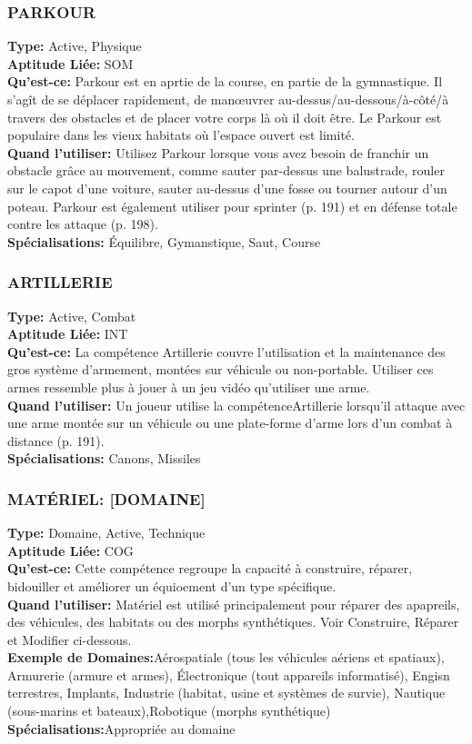 \subsubsection{PARKOUR} \textbf{Type:} Active, Physique\\ \textbf{Aptitude Liée:} SOM \\ \textbf{Qu'est-ce:} Parkour est en aprtie de la course, en partie de la gymnastique. Il s'agît de se déplacer rapidement, de manœuvrer au-dessus/au-dessous/à-côté/à travers des obstacles et de placer votre corps là où il doit être. Le Parkour est populaire dans les vieux habitats où l'espace ouvert est limité. \\ \textbf{Quand l'utiliser:} Utilisez Parkour lorsque vous avez besoin de franchir un obstacle grâce au mouvement, comme sauter par-dessus une balustrade, rouler sur le capot d'une voiture, sauter au-dessus d'une fosse ou tourner autour d'un poteau. Parkour est également utiliser pour sprinter (p. 191) et en défense totale contre les attaque (p. 198). \\ \textbf{Spécialisations:} Équilibre, Gymanstique, Saut, Course 

\subsubsection{ARTILLERIE} \textbf{Type:} Active, Combat \\ \textbf{Aptitude Liée:} INT \\ \textbf{Qu'est-ce:} La compétence Artillerie couvre l'utilisation et la maintenance des gros système d'armement, montées sur véhicule ou non-portable. Utiliser ces armes ressemble plus à jouer à un jeu vidéo qu'utiliser une arme. \\ \textbf{Quand l'utiliser:} Un joueur utilise la compétenceArtillerie lorsqu'il attaque avec une arme montée sur un véhicule ou une plate-forme d'arme lors d'un combat à distance (p. 191). \\ \textbf{Spécialisations:} Canons, Missiles 

\subsubsection{MATÉRIEL: [DOMAINE]} \textbf{Type:} Domaine, Active, Technique \\ \textbf{Aptitude Liée:} COG \\ \textbf{Qu'est-ce:} Cette compétence regroupe la capacité à construire, réparer, bidouiller et améliorer un équioement d'un type spécifique. \\ \textbf{Quand l'utiliser:} Matériel est utilisé principalement pour réparer des apapreils, des véhicules, des habitats ou des morphs synthétiques. Voir Construire, Réparer et Modifier ci-dessous. \\ \textbf{Exemple de Domaines:}Aérospatiale (tous les véhicules aériens et spatiaux), Armurerie (armure et armes), Électronique (tout appareils informatisé), Engisn terrestres, Implants, Industrie (habitat, usine et systèmes de survie), Nautique (sous-marins et bateaux),Robotique (morphs synthétique) \\ \textbf{Spécialisations:}Appropriée au domaine 



